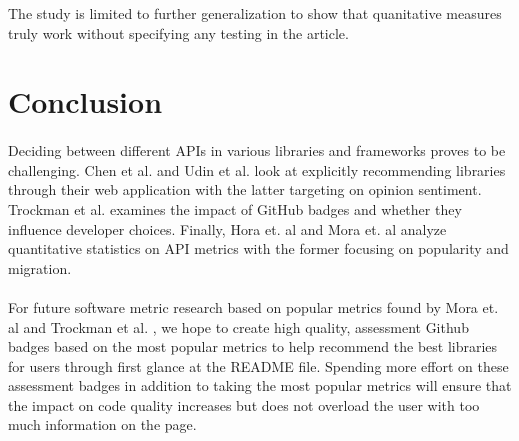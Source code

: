 \documentclass[12pt]{article}
\begin{document}
The study is limited to further generalization to show that quanitative measures truly work without specifying any testing in the article. 

\section{Conclusion}
\paragraph{}
Deciding between different APIs in various libraries and frameworks proves to be challenging. 
Chen et al. \cite{analogical} and Udin et al. \cite{opinerarticle} look at explicitly recommending libraries through their web application with the latter targeting on opinion sentiment. 
Trockman et al. \cite{githubbadges} examines the impact of GitHub \cite{github} badges and whether they influence developer choices.
Finally, Hora et. al \cite{apiwave} and Mora et. al \cite{metrics} analyze quantitative statistics on API metrics with the former focusing on popularity and migration.

\paragraph{}
For future software metric research based on popular metrics found by Mora et. al \cite{metrics}
and Trockman et al. \cite{githubbadges}, we hope to create high quality, assessment Github \cite{github} badges
based on the most popular metrics to help recommend the best libraries for users through first
glance at the README file. Spending more effort on these assessment badges in addition to taking the most popular metrics 
will ensure that the impact on code quality increases
but does not overload the user with too much information on the page. 

\newpage


\end{document}
